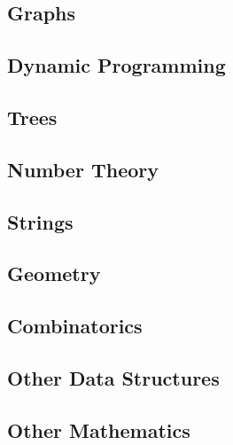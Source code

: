 \documentclass[answers]{exam}
\begin{document}
\subsection{Graphs}
\subsection{Dynamic Programming}
\subsection{Trees}
\subsection{Number Theory}
\subsection{Strings}
\subsection{Geometry}
\subsection{Combinatorics}
\subsection{Other Data Structures}
\subsection{Other Mathematics}
\end{document}
